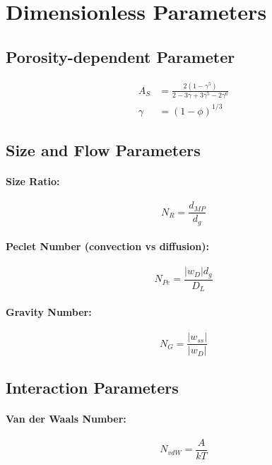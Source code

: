 \documentclass[11pt,a4paper]{article}
\begin{document}
\section{Dimensionless Parameters}

\subsection{Porosity-dependent Parameter}

\begin{align}
A_S &= \frac{2(1-\gamma^5)}{2-3\gamma+3\gamma^5-2\gamma^6} \\[0.5em]
\gamma &= (1-\phi)^{1/3}
\end{align}

\subsection{Size and Flow Parameters}

\paragraph{Size Ratio:}
\begin{equation}
N_R = \frac{d_{MP}}{d_g}
\end{equation}

\paragraph{Peclet Number (convection vs diffusion):}
\begin{equation}
N_{Pe} = \frac{|w_D|d_g}{D_L}
\end{equation}

\paragraph{Gravity Number:}
\begin{equation}
N_G = \frac{|w_{ss}|}{|w_D|}
\end{equation}

\subsection{Interaction Parameters}

\paragraph{Van der Waals Number:}
\begin{equation}
N_{vdW} = \frac{A}{kT}
\end{equation}
\end{document}

